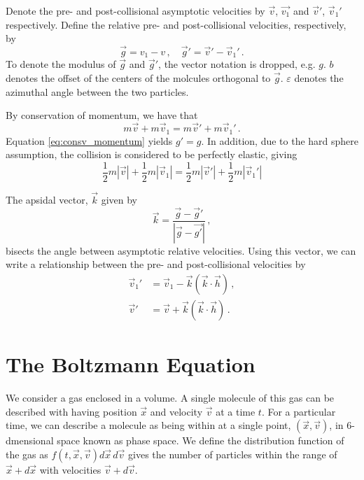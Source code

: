 \documentclass[12pt]{CSUNthesis}
\newcommand{\vecv}{\vec{v}}
\begin{document}
	 Denote the pre- and post-collisional asymptotic velocities by $\vec{v}$, $\vec{v_1}$ and $\vec{v}'$, $\vec{v}_1'$ respectively. Define the relative pre- and post-collisional velocities, respectively, by 
\begin{equation*}
	\vec{g} = v_1 - v\, , \quad \vec{g}' = \vec{v}'-\vec{v}_1' \, .
\end{equation*}
To denote the modulus of $\vec{g}$ and $\vec{g}'$, the vector notation is dropped, e.g. $g$. $b$ denotes the offset of the centers of the molcules orthogonal to $\vec{g}$. $\varepsilon$ denotes the azimuthal angle between the two particles. 

By conservation of momentum, we have that 
\begin{equation}
\label{eq:consv_momentum}
m \vecv + m \vecv_1 = m\vecv' + m\vecv_1'\, .
\end{equation}
Equation \ref{eq:consv_momentum} yields $g' = g$. In addition, due to the hard sphere assumption, the collision is considered to be perfectly elastic, giving
\begin{equation}
\label{eq:consv_kin}
\frac{1}{2} m|\vecv| + \frac{1}{2} m|\vecv_1| = \frac{1}{2}m|\vecv'| + \frac{1}{2}m|\vecv_1'|
\end{equation}

The apsidal vector, $\vec{k}$ given by
\begin{equation*}
\vec{k} = \frac{\vec{g} - \vec{g}'}{|\vec{g} - \vec{g'}|}\, ,
\end{equation*}
bisects the angle between asymptotic relative velocities. Using this vector, we can write a relationship between the pre- and post-collisional velocities by
\begin{align*}
\vec{v}_1' &= \vec{v}_1 - \vec{k}(\vec{k} \cdot \vec{h})\, , \\
\vec{v}' &= \vec{v} + \vec{k}(\vec{k} \cdot \vec{h})\, .
\end{align*}


\section{The Boltzmann Equation}

We consider a gas enclosed in a volume. A single molecule of this gas can be described with having position $\vec{x}$ and velocity $\vec{v}$ at a time $t$. For a particular time, we can describe a molecule as being within at a single point, $(\vec{x},\vec{v})$, in 6-dmensional space known as phase space. We define the distribution function of the gas as $f(t,\vec{x},\vec{v})d\vec{x}\,d\vec{v}$ gives the number of particles within the range of $\vec{x} + d\vec{x}$ with velocities $\vec{v} + d\vec{v}$. 
\end{document}
